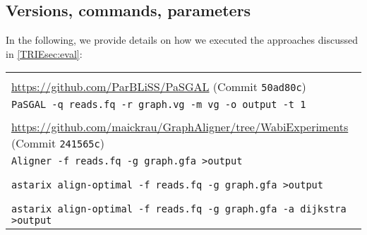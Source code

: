 \subsection{Versions, commands, parameters}
In the following, we provide details on how we executed the approaches
discussed in \cref{TRIEsec:eval}:

\noindent
\begin{tabular}{p{10cm}}
	\textbf{\pasgal} \\
	\url{https://github.com/ParBLiSS/PaSGAL} (Commit \texttt{50ad80c}) \\
	\texttt{PaSGAL -q reads.fq -r graph.vg -m vg -o output -t 1} \\
	\textbf{\bitparallel} \\
	\url{https://github.com/maickrau/GraphAligner/tree/WabiExperiments}
	(Commit \texttt{241565c}) \\
	\texttt{Aligner -f reads.fq -g graph.gfa >output} \\
	\textbf{\astarix} \\
	\astarixurlwithbranch \\
	\texttt{astarix align-optimal -f reads.fq -g graph.gfa >output} \\
	\textbf{\dijkstra} \\
	\astarixurlwithbranch \\
	\texttt{astarix align-optimal -f reads.fq -g graph.gfa -a dijkstra >output}
\end{tabular}